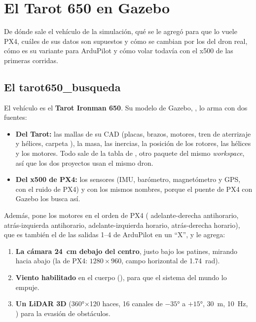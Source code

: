 \chapter{El Tarot 650 en Gazebo}
\label{cap:tarot650}

\begin{enpocas}
De dónde sale el vehículo de la simulación, qué se le agregó para que lo vuele PX4, cuáles de sus datos
son supuestos y cómo se cambian por los del dron real, cómo es su variante para ArduPilot y cómo volar
todavía con el x500 de las primeras corridas.
\end{enpocas}

\section{El tarot650\_busqueda}

El vehículo es el \textbf{Tarot Ironman 650}. Su modelo de Gazebo, , lo arma
 con dos fuentes:
\begin{itemize}
  \item \textbf{Del Tarot:} las mallas de su CAD (placas, brazos, motores, tren de aterrizaje y hélices,
        carpeta ), la masa, las inercias, la posición de los
        rotores, las hélices y los motores. Todo sale de la tabla  de
        , otro paquete del mismo \emph{workspace}, así
        que los dos proyectos usan el mismo dron.
  \item \textbf{Del x500 de PX4:} los sensores (IMU, barómetro, magnetómetro y GPS, con el ruido de PX4)
        y con los mismos nombres, porque el puente de PX4 con Gazebo los busca así.
\end{itemize}
Además,  pone los motores en el orden de PX4 ( adelante-derecha
antihorario,  atrás-izquierda antihorario,  adelante-izquierda horario,
 atrás-derecha horario), que es también el de las salidas 1--4 de ArduPilot en un ``X'', y
le agrega:
\begin{enumerate}
  \item \textbf{La cámara 24~cm debajo del centro}, justo bajo los patines, mirando hacia abajo
        (la  de PX4: $1280\times960$, campo horizontal de 1.74~rad).
  \item \textbf{Viento habilitado} en el cuerpo (), para que el sistema
         del mundo lo empuje.
  \item \textbf{Un LiDAR 3D} (360°$\times$120 haces, 16 canales de $-35$° a $+15$°, 30~m, 10~Hz,
        ) para la evasión de obstáculos.
\end{enumerate}

